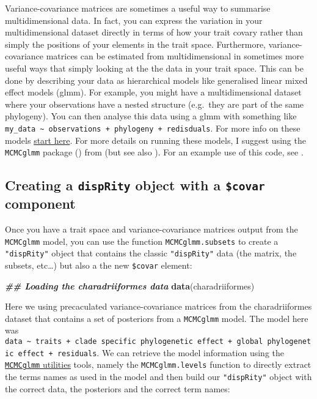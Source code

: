 \documentclass[
]{book}
\newenvironment{Shaded}{\begin{snugshade}}{\end{snugshade}}
\newcommand{\DocumentationTok}[1]{\textcolor[rgb]{0.56,0.35,0.01}{\textbf{\textit{#1}}}}
\newcommand{\FunctionTok}[1]{\textcolor[rgb]{0.13,0.29,0.53}{\textbf{#1}}}
\newcommand{\NormalTok}[1]{#1}
\begin{document}
Variance-covariance matrices are sometimes a useful way to summarise multidimensional data.
In fact, you can express the variation in your multidimensional dataset directly in terms of how your trait covary rather than simply the positions of your elements in the trait space.
Furthermore, variance-covariance matrices can be estimated from multidimensional in sometimes more useful ways that simply looking at the the data in your trait space.
This can be done by describing your data as hierarchical models like generalised linear mixed effect models (glmm).
For example, you might have a multidimensional dataset where your observations have a nested structure (e.g.~they are part of the same phylogeny).
You can then analyse this data using a glmm with something like \texttt{my\_data\ \textasciitilde{}\ observations\ +\ phylogeny\ +\ redisduals}.
For more info on these models \href{https://en.wikipedia.org/wiki/Generalized_linear_mixed_model}{start here}.
For more details on running these models, I suggest using the \texttt{MCMCglmm} package (\citet{MCMCglmm}) from \citet{hadfield2010} (but see also \citet{mulTree}).
For an example use of this code, see \citet{guillerme2023innovation}.

\hypertarget{creating-a-disprity-object-with-a-covar-component}{%
\subsection{\texorpdfstring{Creating a \texttt{dispRity} object with a \texttt{\$covar} component}{Creating a dispRity object with a \$covar component}}\label{creating-a-disprity-object-with-a-covar-component}}

Once you have a trait space and variance-covariance matrices output from the \texttt{MCMCglmm} model, you can use the function \texttt{MCMCglmm.subsets} to create a \texttt{"dispRity"} object that contains the classic \texttt{"dispRity"} data (the matrix, the subsets, etc\ldots) but also a the new \texttt{\$covar} element:

\begin{Shaded}
\begin{Highlighting}[]
\DocumentationTok{\#\# Loading the charadriiformes data}
\FunctionTok{data}\NormalTok{(charadriiformes)}
\end{Highlighting}
\end{Shaded}

Here we using precaculated variance-covariance matrices from the charadriiformes dataset that contains a set of posteriors from a \texttt{MCMCglmm} model.
The model here was \texttt{data\ \textasciitilde{}\ traits\ +\ clade\ specific\ phylogenetic\ effect\ +\ global\ phylogenetic\ effect\ +\ residuals}.
We can retrieve the model information using the \protect\hyperlink{MCMCglmm-utilities}{\texttt{MCMCglmm} utilities} tools, namely the \texttt{MCMCglmm.levels} function to directly extract the terms names as used in the model and then build our \texttt{"dispRity"} object with the correct data, the posteriors and the correct term names:
\end{document}
